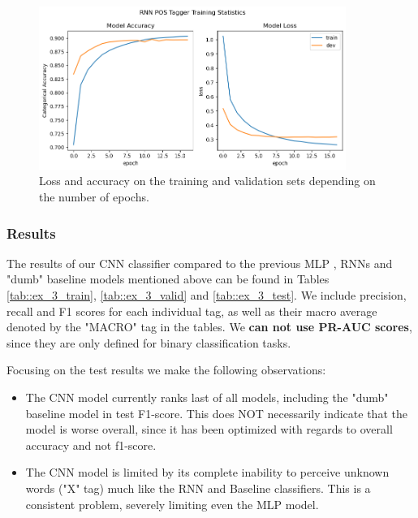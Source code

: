 \documentclass[10pt, a4paper]{article}
\begin{document}
	\begin{figure}
		\centering
		\includegraphics[width=10cm]{"ex_3_fit.png"}
		\caption{Loss and accuracy on the training and validation sets depending on the number of epochs.}
		\label{fig::ex_3_fit}
	\end{figure}
	
	\subsubsection{Results}
	
	The results of our CNN classifier compared to the previous MLP , RNNs and "dumb" baseline models mentioned above can be found in Tables \ref{tab::ex_3_train}, \ref{tab::ex_3_valid} and \ref{tab::ex_3_test}. We include precision, recall and F1 scores for each individual tag, as well as their macro average denoted by the "MACRO" tag in the tables. We \textbf{can not use PR-AUC scores}, since they are only defined for binary classification tasks.
	
	Focusing on the test results we make the following observations:
	\begin{itemize}
		\item The CNN model currently ranks last of all models, including the "dumb" baseline model in test F1-score. This does NOT necessarily indicate that the model is worse overall, since it has been optimized with regards to overall accuracy and not f1-score.
		
		\item The CNN model is limited by its complete inability to perceive unknown words ("X" tag) much like the RNN and Baseline classifiers. This is a consistent problem, severely limiting even the MLP  model.
		
	\end{itemize}
	
	
	
	
	
	
	
\end{document}
